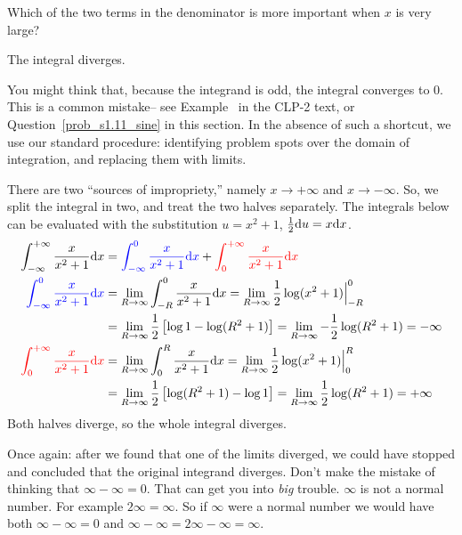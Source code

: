 \begin{hint}
Which of the two terms in the denominator is more important when $x$
is very large?
\end{hint}

\begin{answer}
The integral diverges.
\end{answer}

\begin{solution}
You might think that, because the integrand is odd, the integral
converges to $0$. This is a common mistake-- see Example~ in the
CLP-2 text, or Question~\ref{prob_s1.11_sine} in this section.  In the absence of such a shortcut, we use our standard procedure: identifying problem spots over the domain of integration, and replacing them with limits.

There are two ``sources
of impropriety,'' namely $x\to +\infty$ and $x\to -\infty$.
So, we split the integral in two, and treat the two halves separately. The integrals below can be evaluated with the substitution $u=x^2+1$, $\frac{1}{2}\mathrm{d}u = x\mathrm{d}x$.
\begin{align*}
\int_{-\infty}^{+\infty}\frac{x}{x^2+1}\mathrm{d}x
  &=\textcolor{blue}{ \int_{-\infty}^0\frac{x}{x^2+1}\mathrm{d}x}
   + \textcolor{red}{\int_0^{+\infty}\frac{x}{x^2+1}\mathrm{d}x}\\
\color{blue}\int_{-\infty}^0\frac{x}{x^2+1}\mathrm{d}x
&=\lim_{R\rightarrow\infty}\int_{-R}^0\frac{x}{x^2+1}\mathrm{d}x
=\lim_{R\rightarrow\infty}\frac{1}{2}\log(x^2+1)\Big|_{-R}^0\\
&=\lim_{R \to \infty}\frac{1}{2}\left[\log 1-\log(R^2+1)\right]=\lim_{R\rightarrow\infty}-\frac{1}{2}\log(R^2+1)
=-\infty
\\
\color{red}\int_0^{+\infty}\frac{x}{x^2+1}\mathrm{d}x
&=\lim_{R\rightarrow\infty}\int_0^R\frac{x}{x^2+1}\mathrm{d}x
=\lim_{R\rightarrow\infty}\frac{1}{2}\log(x^2+1)\Big|_0^R\\
&=\lim_{R \to \infty}\frac{1}{2}\left[ \log(R^2+1)-\log 1\right]
=\lim_{R\rightarrow\infty}\frac{1}{2}\log(R^2+1)
=+\infty
\end{align*}
Both halves diverge, so the whole integral diverges.

Once again: after we found that one of the limits diverged, we could have stopped and concluded that the original integrand diverges. Don't make
the mistake of thinking that $\infty-\infty=0$. That can get you into
\emph{big} trouble. $\infty$ is not a normal number. For
example $2\infty=\infty$. So if $\infty$ were a normal number we would have
both $\infty-\infty=0$ and $\infty-\infty=2\infty-\infty =\infty$.
\end{solution}

